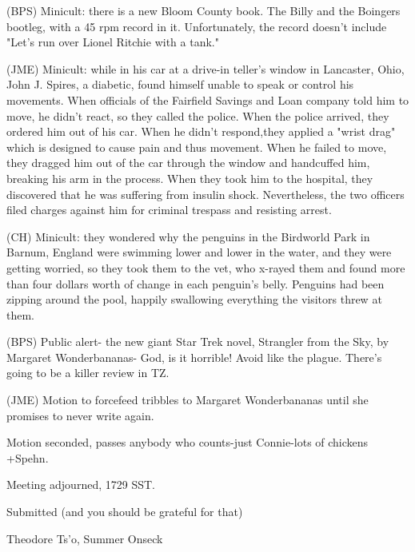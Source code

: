 \documentclass[12pt]{article}
\begin{document}
(BPS) Minicult: there is a new Bloom County book. The Billy and the Boingers bootleg, with a 45 rpm record in it. Unfortunately, the record doesn't include "Let's run over Lionel Ritchie with a tank."

(JME) Minicult: while in his car at a drive-in teller's window  in Lancaster, Ohio, John J. Spires, a diabetic, found himself unable to speak or control his movements. When officials of the Fairfield Savings and Loan company told him to move, he didn't react, so they called the police. When the police arrived, they ordered him out of his car. When he didn't respond,they applied a "wrist drag" which is designed to cause pain and thus movement. When he failed to move, they dragged him out of the car through the window and handcuffed him, breaking his arm in the process. When they took him to the hospital, they discovered that he was suffering from insulin shock. Nevertheless, the two officers filed charges against him for criminal trespass and resisting arrest.

(CH) Minicult: they wondered why the penguins in the Birdworld Park in Barnum, England were swimming lower and lower in the water, and they were getting worried, so they took them to the vet, who x-rayed them and found more than four dollars worth of change in each penguin's belly. Penguins had been zipping around the pool, happily swallowing everything the visitors threw at them.

(BPS) Public alert- the new giant Star Trek novel, Strangler from the Sky, by Margaret Wonderbananas- God, is it horrible! Avoid like the plague. There's going to be a killer review in TZ.

(JME) Motion to forcefeed tribbles to Margaret Wonderbananas until she promises to never write again.

Motion seconded, passes anybody who counts-just Connie-lots of chickens +Spehn.

\vspace{12pt}

\noindent
Meeting adjourned, 1729 SST.

\vspace{18pt}

\centerline{Submitted (and you should be grateful for that)}
\centerline{Theodore Ts'o, Summer Onseck}
\end{document}
